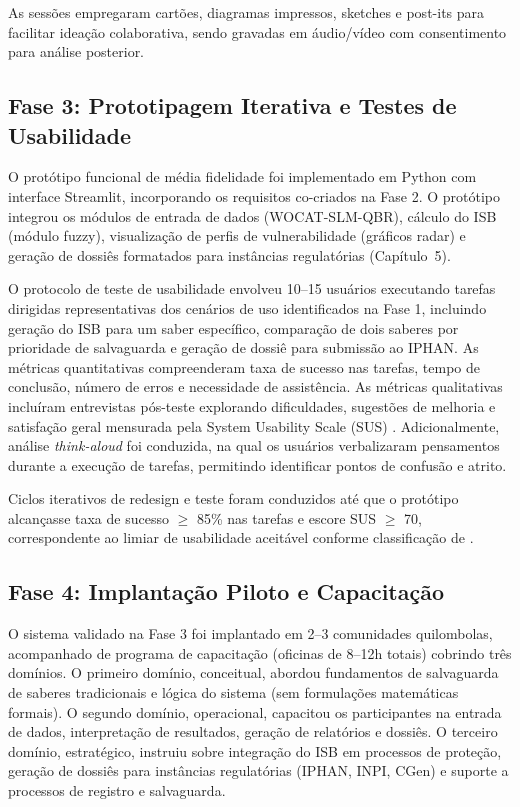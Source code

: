 As sessões empregaram cartões, diagramas impressos, sketches e post-its para facilitar ideação colaborativa, sendo gravadas em áudio/vídeo com consentimento para análise posterior.


\subsection{Fase 3: Prototipagem Iterativa e Testes de Usabilidade}

O protótipo funcional de média fidelidade foi implementado em Python com interface Streamlit, incorporando os requisitos co-criados na Fase 2. O protótipo integrou os módulos de entrada de dados (WOCAT-SLM-QBR), cálculo do ISB (módulo fuzzy), visualização de perfis de vulnerabilidade (gráficos radar) e geração de dossiês formatados para instâncias regulatórias (Capítulo~5).

O protocolo de teste de usabilidade envolveu 10--15 usuários executando tarefas dirigidas representativas dos cenários de uso identificados na Fase 1, incluindo geração do ISB para um saber específico, comparação de dois saberes por prioridade de salvaguarda e geração de dossiê para submissão ao IPHAN. As métricas quantitativas compreenderam taxa de sucesso nas tarefas, tempo de conclusão, número de erros e necessidade de assistência. As métricas qualitativas incluíram entrevistas pós-teste explorando dificuldades, sugestões de melhoria e satisfação geral mensurada pela System Usability Scale (SUS) \cite{Brooke1996}. Adicionalmente, análise \textit{think-aloud} foi conduzida, na qual os usuários verbalizaram pensamentos durante a execução de tarefas, permitindo identificar pontos de confusão e atrito.

Ciclos iterativos de redesign e teste foram conduzidos até que o protótipo alcançasse taxa de sucesso $\geq$ 85\% nas tarefas e escore SUS $\geq$ 70, correspondente ao limiar de usabilidade aceitável conforme classificação de .


\subsection{Fase 4: Implantação Piloto e Capacitação}

O sistema validado na Fase 3 foi implantado em 2--3 comunidades quilombolas, acompanhado de programa de capacitação (oficinas de 8--12h totais) cobrindo três domínios. O primeiro domínio, conceitual, abordou fundamentos de salvaguarda de saberes tradicionais e lógica do sistema (sem formulações matemáticas formais). O segundo domínio, operacional, capacitou os participantes na entrada de dados, interpretação de resultados, geração de relatórios e dossiês. O terceiro domínio, estratégico, instruiu sobre integração do ISB em processos de proteção, geração de dossiês para instâncias regulatórias (IPHAN, INPI, CGen) e suporte a processos de registro e salvaguarda.


